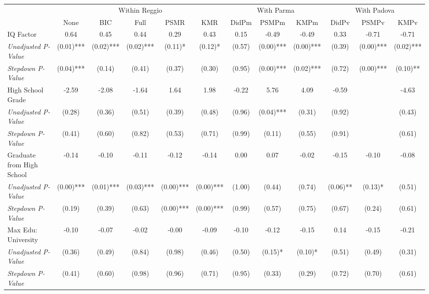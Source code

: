 \begin{tabular}{l c c c c c c c c c c c}
\toprule
& \multicolumn{5}{c}{Within Reggio} & \multicolumn{3}{c}{With Parma} & \multicolumn{3}{c}{With Padova} \\\cmidrule(lr){2-6} \cmidrule(lr){7-9} \cmidrule(lr){10-12}
 & None & BIC & Full & PSMR & KMR & DidPm & PSMPm & KMPm & DidPv & PSMPv & KMPv \\
\midrule
IQ Factor & 0.64 & 0.45 & 0.44 & 0.29 & 0.43 & 0.15 & -0.49 & -0.49 & 0.33 & -0.71 & -0.71 \\
\quad \textit{Unadjusted P-Value} & (0.01)*** & (0.02)*** & (0.02)*** & (0.11)* & (0.12)* & (0.57) & (0.00)*** & (0.00)*** & (0.39) & (0.00)*** & (0.02)*** \\
\quad \textit{Stepdown P-Value} & (0.04)*** & (0.14) & (0.41) & (0.37) & (0.30) & (0.95) & (0.00)*** & (0.02)*** & (0.72) & (0.00)*** & (0.10)** \\
High School Grade & -2.59 & -2.08 & -1.64 & 1.64 & 1.98 & -0.22 & 5.76 & 4.09 & -0.59 & & -4.63 \\
\quad \textit{Unadjusted P-Value} & (0.28) & (0.36) & (0.51) & (0.39) & (0.48) & (0.96) & (0.04)*** & (0.31) & (0.92) & & (0.43) \\
\quad \textit{Stepdown P-Value} & (0.41) & (0.60) & (0.82) & (0.53) & (0.71) & (0.99) & (0.11) & (0.55) & (0.91) & & (0.61) \\
Graduate from High School & -0.14 & -0.10 & -0.11 & -0.12 & -0.14 & 0.00 & 0.07 & -0.02 & -0.15 & -0.10 & -0.08 \\
\quad \textit{Unadjusted P-Value} & (0.00)*** & (0.01)*** & (0.03)*** & (0.00)*** & (0.00)*** & (1.00) & (0.44) & (0.74) & (0.06)** & (0.13)* & (0.51) \\
\quad \textit{Stepdown P-Value} & (0.19) & (0.39) & (0.63) & (0.00)*** & (0.00)*** & (0.99) & (0.57) & (0.75) & (0.67) & (0.24) & (0.61) \\
Max Edu: University & -0.10 & -0.07 & -0.02 & -0.00 & -0.09 & -0.10 & -0.12 & -0.15 & 0.14 & -0.15 & -0.21 \\
\quad \textit{Unadjusted P-Value} & (0.36) & (0.49) & (0.84) & (0.98) & (0.46) & (0.50) & (0.15)* & (0.10)* & (0.51) & (0.49) & (0.31) \\
\quad \textit{Stepdown P-Value} & (0.41) & (0.60) & (0.98) & (0.96) & (0.71) & (0.95) & (0.33) & (0.29) & (0.72) & (0.70) & (0.61) \\
\bottomrule
\end{tabular}
